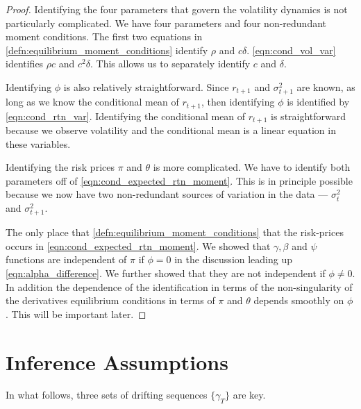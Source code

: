 \documentclass[11pt, letterpaper, twoside, final]{article}
\begin{document}
\begin{appendices}
\begin{proof}
    Identifying the four parameters that govern the volatility dynamics is not particularly complicated. 
    We have four parameters and four non-redundant moment conditions.
    The first two equations in    \cref{defn:equilibrium_moment_conditions} identify $\rho$ and $c \delta$.
    \cref{eqn:cond_vol_var} identifies $\rho c$ and $c^2 \delta$. 
    This allows us to separately identify $c$ and $\delta$.
    
    Identifying $\phi$ is also relatively straightforward. Since $r_{t+1}$ and $\sigma^2_{t+1}$ are known, as long
    as we know the conditional mean of $r_{t+1}$, then identifying $\phi$ is identified by \cref{eqn:cond_rtn_var}.
    Identifying the conditional mean of $r_{t+1}$ is straightforward because we observe volatility and the
    conditional mean is a linear equation in these variables. 
    

    Identifying the risk prices $\pi$ and $\theta$ is more complicated.
    We have to identify both parameters off of \cref{eqn:cond_expected_rtn_moment}. 
    This is in principle possible because we now have two non-redundant sources of variation in the data ---
    $\sigma^2_t$ and $\sigma^2_{t+1}$.

    The only place that \cref{defn:equilibrium_moment_conditions} that the risk-prices occurs in
    \cref{eqn:cond_expected_rtn_moment}. 
    We showed that $\gamma, \beta$ and $\psi$ functions are independent of $\pi$ if $\phi = 0$ in the discussion
    leading up \cref{eqn:alpha_difference}.
    We further showed that they are not independent if $\phi \neq 0$.
    In addition the dependence of the identification in terms of the non-singularity of the derivatives
    equilibrium conditions in terms of $\pi$ and $\theta$ depends smoothly on $\phi$. 
    This will be important later.
    
\end{proof}

\section{Inference Assumptions}

    In what follows, three sets of drifting sequences $\lbrace \gamma_T \rbrace$ are key. 
    

\end{appendices}
\end{document}
